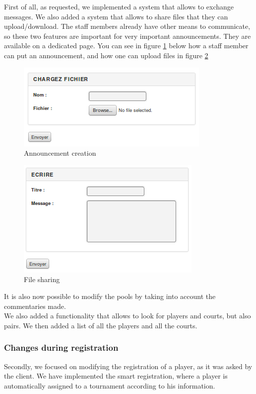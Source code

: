 \documentclass[a4paper, 12pt]{article}
\begin{document}
First of all, as requested, we implemented a system that allows to exchange messages. We also added a system that allows to share files that they can upload/download. The staff members already have other means to communicate, so these two features are important for very important announcements. They are available on a dedicated page. You can see in figure \ref{annonce} below how a staff member can put an announcement, and how one can upload files in figure \ref{file} \\
\begin{figure}[h]
  \caption{\label{annonce} Announcement creation}
  \includegraphics[scale=0.7]{annonce.png}
\end{figure}
\begin{figure}[h]
  \caption{\label{file} File sharing}
  \includegraphics[scale=0.7]{fichier.png}
\end{figure}


It is also now possible to modify the pools by taking into account the commentaries made.\\

We also added a functionality that allows to look for players and courts, but also pairs. We then added a list of all the players and all the courts.

\subsubsection*{Changes during registration}
Secondly, we focused on modifying the registration of a player, as it was asked by the client. We have implemented the smart registration, where a player is automatically assigned to a tournament according to his information.\\
\end{document}
